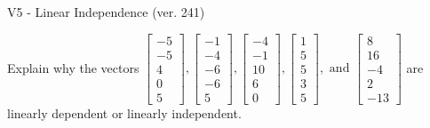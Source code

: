 \begin{exercise}
  \begin{exerciseTitle}V5 - Linear Independence (ver. 241)\end{exerciseTitle}
  \begin{exerciseStatement}
    Explain why the vectors \(\left[\begin{array}{r}
-5 \\
-5 \\
4 \\
0 \\
5
\end{array}\right] , \left[\begin{array}{r}
-1 \\
-4 \\
-6 \\
-6 \\
5
\end{array}\right] , \left[\begin{array}{r}
-4 \\
-1 \\
10 \\
6 \\
0
\end{array}\right] , \left[\begin{array}{r}
1 \\
5 \\
5 \\
3 \\
5
\end{array}\right] , \text{ and } \left[\begin{array}{r}
8 \\
16 \\
-4 \\
2 \\
-13
\end{array}\right]\) are linearly dependent or linearly independent.	



\end{exerciseStatement}
\end{exercise}
